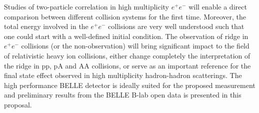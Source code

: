 Studies of two-particle correlation in high multiplicity $e^+e^-$ will enable a direct comparison between different collision systems for the first time. Moreover, the total energy involved in the $e^+e^-$ collisions are very well understood such that one could start with a well-defined initial condition. The observation of ridge in $e^+e^-$ collisions (or the non-observation) will bring significant impact to the field of relativistic heavy ion collisions, either change completely the interpretation of the ridge in pp, pA and AA collisions, or serve as an important reference for the final state effect observed in high multiplicity hadron-hadron scatterings. The high performance BELLE detector is ideally suited for the proposed measurement and preliminary results from the BELLE B-lab open data is presented in this proposal.

